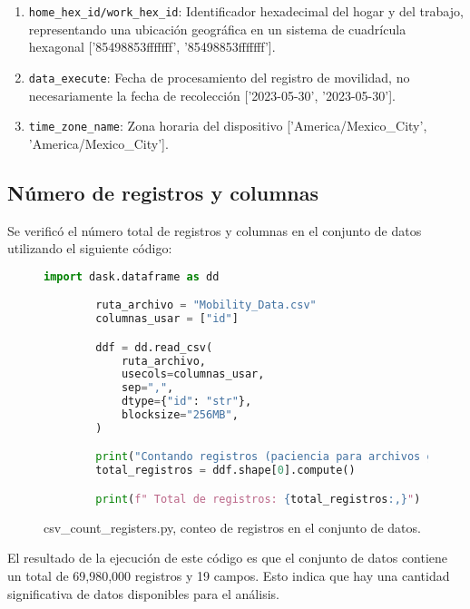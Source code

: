 \begin{enumerate}[leftmargin=*, align=left, noitemsep]
    \item \texttt{home\_hex\_id/work\_hex\_id}: Identificador hexadecimal del hogar y del trabajo, representando una ubicación geográfica en un sistema de cuadrícula hexagonal ['85498853fffffff', '85498853fffffff'].
    \item \texttt{data\_execute}: Fecha de procesamiento del registro de movilidad, no necesariamente la fecha de recolección ['2023-05-30', '2023-05-30'].
    \item \texttt{time\_zone\_name}: Zona horaria del dispositivo ['America\textdollar/Mexico\_City', 'America/Mexico\_City'].
\end{enumerate}

\newpage
\subsection{Número de registros y columnas}
\noindent Se verificó el número total de registros y columnas en el conjunto de datos utilizando el siguiente código:

\begin{figure}[h]
    \centering
    \begin{lstlisting}[language=Python, breaklines=true]
        import dask.dataframe as dd

        ruta_archivo = "Mobility_Data.csv" 
        columnas_usar = ["id"]  

        ddf = dd.read_csv(
            ruta_archivo,
            usecols=columnas_usar, 
            sep=",",             
            dtype={"id": "str"},  
            blocksize="256MB",   
        )

        print("Contando registros (paciencia para archivos grandes)...")
        total_registros = ddf.shape[0].compute() 

        print(f" Total de registros: {total_registros:,}")
    \end{lstlisting}
    \caption{csv\_count\_registers.py, conteo de registros en el conjunto de datos.}
    \label{fig:csv_count}
\end{figure}


\noindent El resultado de la ejecución de este código es que el conjunto de datos contiene un total de 69,980,000 registros y 19 campos. Esto indica que hay una cantidad significativa de datos disponibles para el análisis.

